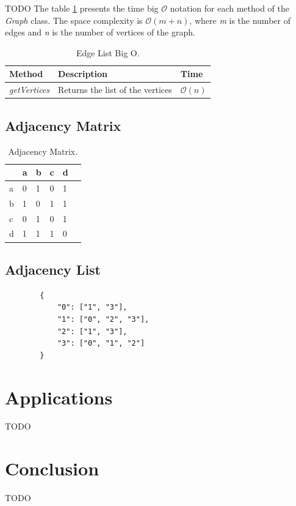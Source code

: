 \documentclass[a4paper]{article}
\begin{document}
    TODO The table \ref{tab:edge-list-o} presents the
    time big $\mathcal{O}$ notation for each method of the
    \emph{Graph} class.
    The space complexity is $\mathcal{O}(m+n)$, where
    \emph{m} is the number of edges and \emph{n} is the
    number of vertices of the graph.

    \begin{table}[H]
        \centering
        \caption{\label{tab:edge-list-o}Edge List Big O.}
        \vspace*{10pt}
        \begin{tabular}{ |l|l|l| }
            \hline
            Method & Description & Time \\
            \hline
            \emph{getVertices} &
                Returns the list of the vertices &
                $\mathcal{O}(n)$ \\
            \hline
        \end{tabular}
    \end{table}





    \subsection{Adjacency Matrix} \label{adjacency_matrix}


    \begin{table}[H]
        \centering
        \caption{\label{tab:adjacency-matrix}Adjacency Matrix.}
        \vspace*{10pt}
        \begin{tabular}{ l|l|l|l|l|l| }
                & a & b & c & d \\
            \hline
            a   & 0 & 1 & 0 & 1 \\
            b   & 1 & 0 & 1 & 1 \\
            c   & 0 & 1 & 0 & 1 \\
            d   & 1 & 1 & 1 & 0 \\
            \hline
        \end{tabular}
    \end{table}



    \subsection{Adjacency List} \label{adjacency_list}


    \begin{verbatim}
        {
            "0": ["1", "3"],
            "1": ["0", "2", "3"],
            "2": ["1", "3"],
            "3": ["0", "1", "2"]
        }

    \end{verbatim}


    \section{Applications}
    TODO


    \section*{Conclusion}
    TODO

    
    
\end{document}
